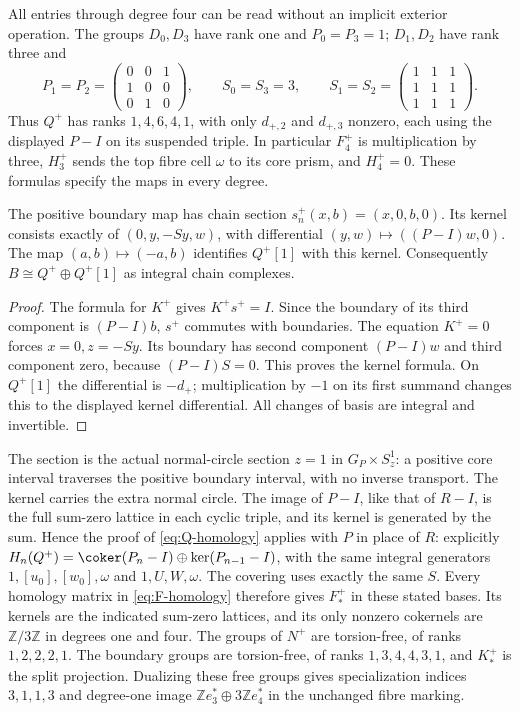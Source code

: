 All entries through degree four can be read without an implicit
exterior operation. The groups $D_0,D_3$ have rank one and
$P_0=P_3=1$; $D_1,D_2$ have rank three and
\[
 P_1=P_2=\begin{pmatrix}0&0&1\\1&0&0\\0&1&0\end{pmatrix},
 \qquad S_0=S_3=3,\qquad
 S_1=S_2=\begin{pmatrix}1&1&1\\1&1&1\\1&1&1\end{pmatrix}.
\]
Thus $Q^+$ has ranks $1,4,6,4,1$, with only $d_{+,2}$ and
$d_{+,3}$ nonzero, each using the displayed $P-I$ on its suspended
triple. In particular $F^+_4$ is multiplication by three, $H^+_3$
sends the top fibre cell $\omega$ to its core prism, and $H^+_4=0$.
These formulas specify the maps in every degree.

\begin{proposition}\label{prop:positive-splitting}
The positive boundary map has chain section
$s^+_n(x,b)=(x,0,b,0)$. Its kernel consists exactly of
$(0,y,-Sy,w)$, with differential $(y,w)\mapsto((P-I)w,0)$.
The map $(a,b)\mapsto(-a,b)$ identifies $Q^+[1]$ with this kernel.
Consequently $B\cong Q^+\oplus Q^+[1]$ as integral chain complexes.
\end{proposition}
\begin{proof}
The formula for $K^+$ gives $K^+s^+=I$. Since the boundary of
its third component is $(P-I)b$, $s^+$ commutes with boundaries.
The equation $K^+=0$ forces $x=0,z=-Sy$. Its boundary has
second component $(P-I)w$ and third component zero, because
$(P-I)S=0$. This proves the kernel formula. On $Q^+[1]$ the
differential is $-d_+$; multiplication by $-1$ on its first
summand changes this to the displayed kernel differential.
All changes of basis are integral and invertible.
\end{proof}

The section is the actual normal-circle section $z=1$ in
$G_P\times S^1_z$: a positive core interval traverses the positive
boundary interval, with no inverse transport. The kernel carries
the extra normal circle. The image of $P-I$, like that of $R-I$,
is the full sum-zero lattice in each cyclic triple, and its kernel
is generated by the sum. Hence the proof of
\eqref{eq:Q-homology} applies with $P$ in place of $R$: explicitly
$H_n(Q^+)=\coker(P_n-I)\oplus\ker(P_{n-1}-I)$, with the same
integral generators $1,[u_0],[w_0],\omega$ and $1,U,W,\omega$.
The covering uses exactly the same $S$. Every homology matrix in
\eqref{eq:F-homology} therefore gives $F^+_*$ in these stated bases.
Its kernels are the indicated sum-zero lattices, and its only
nonzero cokernels are $\mathbb Z/3\mathbb Z$ in degrees one and four.
The groups of $N^+$ are torsion-free, of ranks $1,2,2,2,1$.
The boundary groups are torsion-free, of ranks $1,3,4,4,3,1$,
and $K^+_*$ is the split projection. Dualizing these free groups
gives specialization indices $3,1,1,3$ and degree-one image
$\mathbb Ze_3^*\oplus3\mathbb Ze_4^*$ in the unchanged fibre marking.

